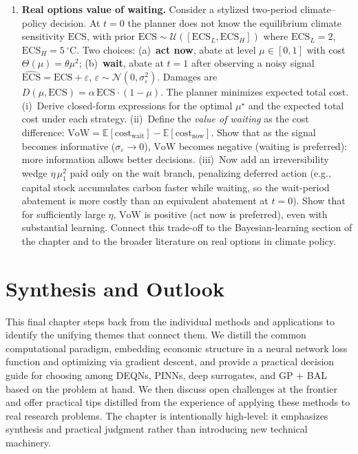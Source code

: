 \documentclass[11pt,a4paper]{report}
\begin{document}
\begin{enumerate}[itemsep=4pt, leftmargin=*]
\item\label{ex:ch11:9} \textbf{Real options value of waiting.}  Consider a stylized two-period climate--policy decision.  At $t = 0$ the planner does not know the equilibrium climate sensitivity $\mathrm{ECS}$, with prior $\mathrm{ECS} \sim \mathcal{U}([\mathrm{ECS}_L, \mathrm{ECS}_H])$ where $\mathrm{ECS}_L = 2$, $\mathrm{ECS}_H = 5$\,$^\circ\mathrm{C}$.  Two choices: (a)~\textbf{act now}, abate at level $\mu \in [0,1]$ with cost $\Theta(\mu) = \theta\mu^2$; (b)~\textbf{wait}, abate at $t=1$ after observing a noisy signal $\widehat{\mathrm{ECS}} = \mathrm{ECS} + \varepsilon$, $\varepsilon \sim \mathcal{N}(0, \sigma_\varepsilon^2)$.  Damages are $D(\mu, \mathrm{ECS}) = \alpha\,\mathrm{ECS}\cdot(1 - \mu)$.  The planner minimizes expected total cost.  (i)~Derive closed-form expressions for the optimal $\mu^\star$ and the expected total cost under each strategy.  (ii)~Define the \emph{value of waiting} as the cost difference: $\mathrm{VoW} = \mathbb{E}[\mathrm{cost}_\mathrm{wait}] - \mathbb{E}[\mathrm{cost}_\mathrm{now}]$.  Show that as the signal becomes informative ($\sigma_\varepsilon \to 0$), $\mathrm{VoW}$ becomes negative (waiting is preferred): more information allows better decisions.  (iii)~Now add an irreversibility wedge $\eta\,\mu_1^2$ paid only on the wait branch, penalizing deferred action (e.g., capital stock accumulates carbon faster while waiting, so the wait-period abatement is more costly than an equivalent abatement at $t = 0$).  Show that for sufficiently large $\eta$, $\mathrm{VoW}$ is positive (act now is preferred), even with substantial learning.  Connect this trade-off to the Bayesian-learning section of the chapter and to the broader literature on real options in climate policy.
\end{enumerate}


\chapter{Synthesis and Outlook}
\label{ch:outlook}

This final chapter steps back from the individual methods and applications to identify the unifying themes that connect them.  We distill the common computational paradigm, embedding economic structure in a neural network loss function and optimizing via gradient descent, and provide a practical decision guide for choosing among DEQNs, PINNs, deep surrogates, and GP + BAL based on the problem at hand.  We then discuss open challenges at the frontier and offer practical tips distilled from the experience of applying these methods to real research problems.
The chapter is intentionally high-level: it emphasizes synthesis and practical judgment rather than introducing new technical machinery.
\end{document}

